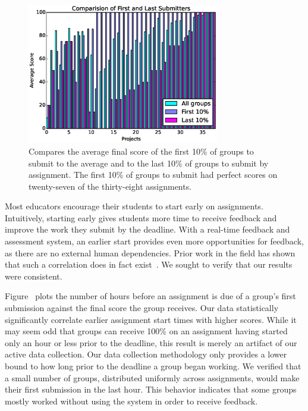 \begin{figure}[!t]
\centering
\includegraphics[width=3.3in]{graphs/Comparision_of_First_and_Last_Submitters.eps}
\caption{Compares the average final score of the first 10\% of groups to submit
  to the average and to the last 10\% of groups to submit by assignment. The
  first 10\% of groups to submit had perfect scores on twenty-seven of the
  thirty-eight assignments.}
\end{figure}

Most educators encourage their students to start early on
assignments. Intuitively, starting early gives students more time to receive
feedback and improve the work they submit by the deadline. With a real-time
feedback and assessment system, an earlier start provides even more
opportunities for feedback, as there are no external human dependencies. Prior
work in the field has shown that such a correlation does in fact
exist~\cite{Spacco:2013:TIP:2462476.2465594,
  Edwards:2009:CEI:1584322.1584325}. We sought to verify that our results were
consistent.

Figure~ plots the number of hours before an
assignment is due of a group's first submission against the final score the
group receives. Our data statistically significantly correlate earlier
assignment start times with higher scores. While it may seem odd that groups
can receive 100\% on an assignment having started only an hour or less prior to
the deadline, this result is merely an artifact of our active data
collection. Our data collection methodology only provides a lower bound to how
long prior to the deadline a group began working. We verified that a small
number of groups, distributed uniformly across assignments, would make their
first submission in the last hour. This behavior indicates that some groups
mostly worked without using the system in order to receive feedback.

